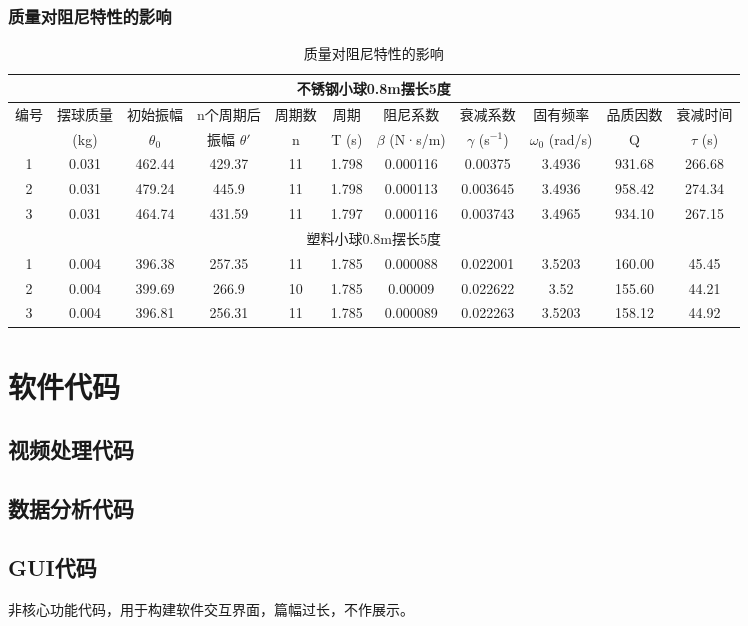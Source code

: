 \documentclass[lang=cn,a4paper,newtx,bibstyle=gb7714-2015]{elegantpaper}
\newcommand{\threelinetablestyle}{%
  \renewcommand{\arraystretch}{1.2}%
  \setlength{\tabcolsep}{3.5pt}%
  \small%
}
\numberwithin{equation}{section} %
\begin{document}
\subsubsection{质量对阻尼特性的影响}
\begin{table}[H]
\centering
\threelinetablestyle
\caption{质量对阻尼特性的影响}
\setlength{\tabcolsep}{2pt}
\footnotesize
\begin{tabular}{ccccccccccc}
\toprule
\multicolumn{11}{c}{不锈钢小球0.8m摆长5度} \\
\midrule
编号 & 摆球质量 & 初始振幅 & n个周期后 & 周期数 & 周期 & 阻尼系数 & 衰减系数 & 固有频率 & 品质因数 & 衰减时间 \\
 & (kg) & $\theta_0$ & 振幅 $\theta'$ & n & T (s) & $\beta$ (N·s/m) & $\gamma$ (s$^{-1}$) & $\omega_0$ (rad/s) & Q & $\tau$ (s) \\
\midrule
1 & 0.031 & 462.44 & 429.37 & 11 & 1.798 & 0.000116 & 0.00375 & 3.4936 & 931.68 & 266.68 \\
2 & 0.031 & 479.24 & 445.9 & 11 & 1.798 & 0.000113 & 0.003645 & 3.4936 & 958.42 & 274.34 \\
3 & 0.031 & 464.74 & 431.59 & 11 & 1.797 & 0.000116 & 0.003743 & 3.4965 & 934.10 & 267.15 \\
\midrule
\multicolumn{11}{c}{塑料小球0.8m摆长5度} \\
\midrule
1 & 0.004 & 396.38 & 257.35 & 11 & 1.785 & 0.000088 & 0.022001 & 3.5203 & 160.00 & 45.45 \\
2 & 0.004 & 399.69 & 266.9 & 10 & 1.785 & 0.00009 & 0.022622 & 3.52 & 155.60 & 44.21 \\
3 & 0.004 & 396.81 & 256.31 & 11 & 1.785 & 0.000089 & 0.022263 & 3.5203 & 158.12 & 44.92 \\
\bottomrule
\end{tabular}
\label{tab:mass_effect_on_damping}
\end{table}
\label{app:mass_effect_on_damping}

\section{软件代码}
\label{app:software_code}
\subsection{视频处理代码}

\subsection{数据分析代码}

\subsection{GUI代码}
非核心功能代码，用于构建软件交互界面，篇幅过长，不作展示。
\end{document}
